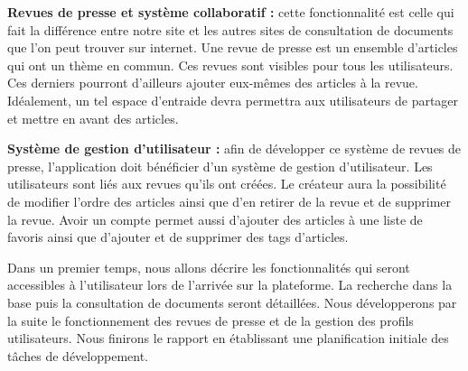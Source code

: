     \textbf{Revues de presse et système collaboratif :} cette fonctionnalité est celle qui fait la différence entre notre site et les autres sites de consultation de documents que l'on peut trouver sur internet. Une revue de presse est un ensemble d'articles qui ont un thème en commun. Ces revues sont visibles pour tous les utilisateurs. Ces derniers pourront d'ailleurs ajouter eux-mêmes des articles à la revue. Idéalement, un tel espace d’entraide devra permettra aux utilisateurs de partager et mettre en avant des articles.
		
		\textbf{Système de gestion d'utilisateur :} afin de développer ce système de revues de presse, l’application doit bénéficier d’un système de gestion d’utilisateur. Les utilisateurs sont liés aux revues qu’ils ont créées. Le créateur aura la possibilité de modifier l'ordre des articles ainsi que d'en retirer de la revue et de supprimer la revue. Avoir un compte permet aussi d'ajouter des articles à une liste de favoris ainsi que d'ajouter et de supprimer des tags d'articles.

    Dans un premier temps, nous allons décrire les fonctionnalités qui seront accessibles à l'utilisateur lors de l'arrivée sur la plateforme. La recherche dans la base puis la consultation de documents seront détaillées. Nous développerons par la suite le fonctionnement des revues de presse et de la gestion des profils utilisateurs. Nous finirons le rapport en établissant une planification initiale des tâches de développement.